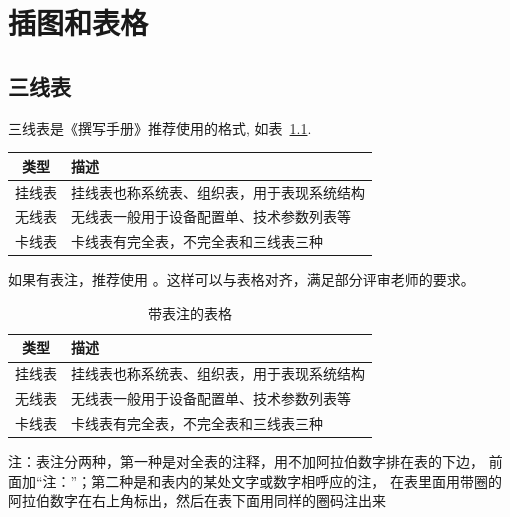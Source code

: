 
\chapter{插图和表格}

\section{三线表}

三线表是《撰写手册》推荐使用的格式, 如表~\ref{tab:exampletable}.

\begin{table}
  \centering
  \label{tab:exampletable}
  \begin{tabular}{cl}
    \toprule
    类型   & 描述                                       \\
    \midrule
    挂线表 & 挂线表也称系统表、组织表，用于表现系统结构 \\
    无线表 & 无线表一般用于设备配置单、技术参数列表等   \\
    卡线表 & 卡线表有完全表，不完全表和三线表三种       \\
    \bottomrule
  \end{tabular}
\end{table}

如果有表注，推荐使用 。这样可以与表格对齐，满足部分评审老师的要求。

\begin{table}
  \centering
  \begin{threeparttable}
    \caption{带表注的表格}
    \label{tab:tablewithnotes}
    \begin{tabular}{cl}
      \toprule
      类型   & 描述                                       \\
      \midrule
      挂线表 & 挂线表也称系统表、组织表，用于表现系统结构 \\
      无线表 & 无线表一般用于设备配置单、技术参数列表等   \\
      卡线表 & 卡线表有完全表，不完全表和三线表三种       \\
      \bottomrule
    \end{tabular}
    \begin{tablenotes}[flushleft]
      \item 注：表注分两种，第一种是对全表的注释，用不加阿拉伯数字排在表的下边，
      前面加“注：”；第二种是和表内的某处文字或数字相呼应的注，
      在表里面用带圈的阿拉伯数字在右上角标出，然后在表下面用同样的圈码注出来
    \end{tablenotes}
  \end{threeparttable}
\end{table}

